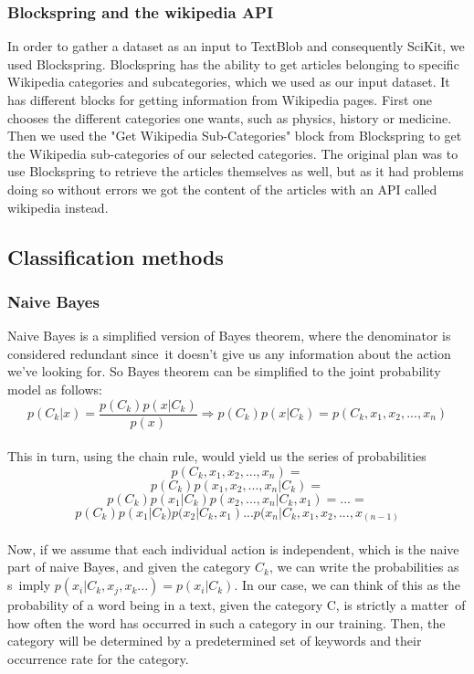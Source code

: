 \documentclass[a4paper]{article}
\begin{document}
\subsubsection{Blockspring and the wikipedia API}

In order to gather a dataset as an input to TextBlob and consequently SciKit, we used Blockspring. Blockspring has the ability to get articles belonging to specific Wikipedia categories and subcategories, which we used as our input dataset. It has different blocks for getting information from Wikipedia pages. First one chooses the different categories one wants, such as physics, history or medicine. Then we used the "Get Wikipedia Sub-Categories" block from Blockspring to get the Wikipedia sub-categories of our selected categories. The original plan was to use Blockspring to retrieve the articles themselves as well, but as it had problems doing so without errors we got the content of the articles with an API called wikipedia instead. 




\subsection{Classification methods}
\subsubsection{Naive Bayes} 

Naive Bayes is a simplified version of Bayes theorem, where the denominator is considered redundant since\
 it doesn't give us any information about the action we've looking for. So Bayes theorem can be simplified to the joint probability model as follows:
\\\[p(C_k|x) = \frac{p(C_k)p(x|C_k)}{p(x)} \Longrightarrow p(C_k)p(x|C_k) = p(C_k,x_1,x_2,...,x_n)\]\\
This in turn, using the chain rule, would yield us the series of probabilities \[p(C_k,x_1,x_2,...,x_n) = \]
\[p(C_k)p(x_1,x_2,...,x_n|C_k) =\]
\[p(C_k)p(x_1|C_k)p(x_2,...,x_n|C_k, x_1) = ... =\]
\[p(C_k)p(x_1|C_k)p(x_2|C_k, x_1) ... p(x_n|C_k, x_1, x_2,...,x_(n-1) \]\\
Now, if we assume that each individual action is independent, which is the naive part of naive Bayes, and given the category $C_k$, we can write the probabilities as s\
imply $p(x_i|C_k, x_j,x_k...) = p(x_i|C_k)$. In our case, we can think of this as the probability of a word being in a text, given the category C, is strictly a matter\
 of how often the word has occurred in such a category in our training. Then, the category will be determined by a predetermined set of keywords and their occurrence 
rate for the category.\\
\end{document}
